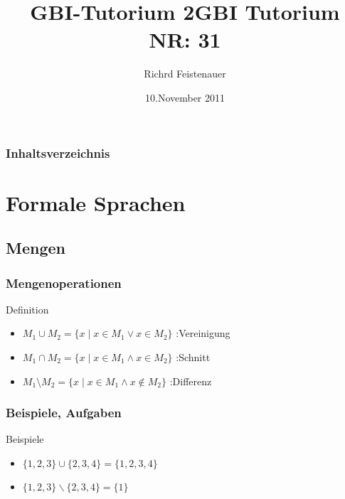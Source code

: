 \documentclass{beamer}
\author{Richrd Feistenauer}
\title{GBI-Tutorium 2}
\date{10.November 2011}
\title {GBI Tutorium NR: 31}
\begin{document}
\begin {frame}
\titlepage
\end {frame}
\begin {frame}
\frametitle {Inhaltsverzeichnis}
\tableofcontents
\end {frame}

\section{Formale Sprachen}
\subsection[Mengen]{Mengen}
\begin{frame}
\frametitle{Mengenoperationen}
\begin{block}{Definition}
\begin{itemize}
\item $ M_1 \cup M_2 = \{x \mid x \in M_1 \lor x \in M_2\} $ :Vereinigung
\item $ M_1 \cap M_2 = \{ x \mid x \in M_1 \land x \in M_2 \} $ :Schnitt
\item $ M_1 \setminus M_2 = \{x \mid x \in M_1 \land x \notin M_2 \}$ :Differenz
\end{itemize}
\end{block}	
\end{frame}
\begin{frame}
\frametitle{Beispiele, Aufgaben}
\begin{block}{Beispiele}
\begin{itemize}[<+->]
\item $\{1,2,3\} \cup \{2,3,4\} = \{1,2,3,4\}$ \newline {}
\item $\{1,2,3\} \backslash \{2,3,4\} = \{1\}$
\end{itemize}
\end{block}
\end{frame}
\end{document}

